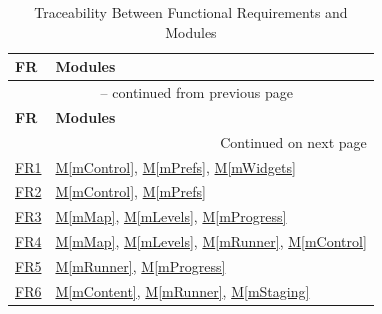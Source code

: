 \documentclass[10pt, titlepage]{article}
\newcommand{\srsurl}{https://team-hindsight.github.io/ophthamology-game/SRS/SRS.pdf}
\newcommand{\srsitemref}[2]{\href{\srsurl\#nameddest=#1}{#2}}
\newcommand{\mref}[1]{\texorpdfstring{\hyperref[md:#1]{M\ref*{#1}}}{M\ref*{#1}}}
\begin{document}
\begin{longtable}{@{}p{}p{}@{}}
\caption{Traceability Between Functional Requirements and Modules}\label{TblFRModules}\\
\toprule
\textbf{FR} & \textbf{Modules} \\
\midrule
\endfirsthead
\multicolumn{2}{c}{\tablename\ \thetable{} -- continued from previous page} \\
\toprule
\textbf{FR} & \textbf{Modules} \\
\midrule
\endhead
\midrule
\multicolumn{2}{r}{Continued on next page} \\
\endfoot
\bottomrule
\endlastfoot

\srsitemref{FR_MedicalNotice}{FR1} & \mref{mControl}, \mref{mPrefs}, \mref{mWidgets} \\
\srsitemref{FR_RecordAck}{FR2} & \mref{mControl}, \mref{mPrefs} \\
\srsitemref{FR_JourneyMap}{FR3} & \mref{mMap}, \mref{mLevels}, \mref{mProgress} \\
\srsitemref{FR_StartLevel}{FR4} & \mref{mMap}, \mref{mLevels}, \mref{mRunner}, \mref{mControl} \\
\srsitemref{FR_Replay}{FR5} & \mref{mRunner}, \mref{mProgress} \\
\srsitemref{FR_LevelContent}{FR6} & \mref{mContent}, \mref{mRunner}, \mref{mStaging} \\


\end{longtable}
\end{document}

